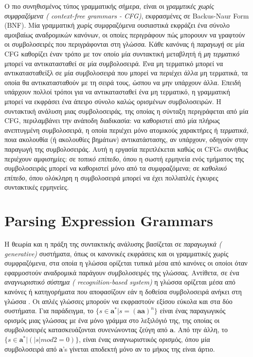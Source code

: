\documentclass[diploma]{softlab-thesis}
\begin{document}
Ο πιο συνηθισμένος τύπος γραμματικής σήμερα, είναι οι \textit{γραμμτικές χωρίς συμφραζόμενα ( context-free grammars - CFG)}, εκφρασμένες σε  Backus-Naur Form (BNF). 
Μία γραμματική χωρίς συμφραζόμενα ουσιαστικά εκφράζει ένα σύνολο αμοιβαίως αναδρομικών κανόνων, οι οποίες περιγράφουν πώς μπορουυν να γραφτούν οι συμβολοσειρές που περιγράφονται στη γλώσσα.
Κάθε κανόνας ή \textit{ παραγωγή}  σε μία  CFG καθορίζει έναν τρόπο με τον οποίο μία συντακτική μεταβλητή ή  \textit{ μη τερματικό} μπορεί να αντικατασταθεί σε μία συμβολοσειρά. 
Ένα μη τερματικό μπορεί να αντικατασταθείξλ σε μία συμβολοσειρά που μπορεί να περιέχει άλλα μη τερματικά, τα οποία θα αντικατασταθούν με τη σειρά τους, ώσπου να μην υπάρχουν άλλα.
Επειδή υπάρχουν πολλοί τρόποι για να αντικατασταθεί ένα μη τερματικό, η γραμματική μπορεί να εκφράσει ένα άπειρο σύνολο καλώς ορισμένων συμβολοσειρών.
Η συντακτική ανάλυση μιας συμβολοσειράς, της οποίας η σύνταξη περιγράφεται από μία  CFG, περιλαμβάνει την ανάποδη διαδικασία: 
να καθοριστεί από μία πλήρως ανεπτυγμένη συμβολοσειρά, η οποία περιέχει μόνο ατομικούς χαρακτήρες ή  \textit{ τερματικά}, ποια ακολουθία (ή ακολουθίες βημάτων) αντικατάστασης, αν υπάρχουν, οδηγούν στην παραγωγή της συμβολοσειράς.
Αυτή η εργασία περιπλέκεται καθώς οι  CFGs  συνήθως περιέχουν αμφισημίες:
σε  \textit{τοπικό επίπεδο}, όπου η σωστή ερμηνεία ενός τμήματος της συμβολοσειράς μπορεί να καθοριστεί μόνο από τα συμφραζόμενα; 
σε \textit{καθολικό επίπεδο}, όπου ολόκληρη η συμβολοσειρά μπορεί να έχει πολλαπλές έγκυρες συντακτικές ερμηνείες.

\section{ Parsing Expression Grammars}
 Η θεωρία και η πράξη της συντακτικής ανάλυσης βασίζεται σε \textit{ παραγωγικά ( generative)} συστήματα, όπως οι κανονικές εκφράσεις και οι γραμματικές χωρίς συμφραζόμενα, στα οποία η γλώσσα ορίζεται τυπικά μέσα από κανόνες οι οποίοι όταν εφαρμοστούν αναδρομικά παράγουν συμβολοσειρές της γλώσσας.
Αντίθετα, σε ένα \textit{ αναγνωριστικό σύστημα ( recognition-based system)} η γλώσσα ορίζεται μέσα από κανόνες ή κατηγορήματα που αποφασίζουν εάν η δοθείσα συμβολοσειρά ανήκει στη γλώσσα \cite{Ford2004}.
Οι απλές γλώσσες μπορούν να εκφραστούν εξίσου εύκολα και στα δύο συστήματα.
 Για παράδειγμα, το $\{ s \in \mathbf{a}^* | s = {(\mathbf{a}\mathbf{a})}^n\}$ είναι ένας παραγωγικός ορισμός μιας γλώσσας με ένα μόνο γράμμα στο λεξιλόγιό της, της οποίας οι συμβολοσειρές 
 κατασκευάζονται συνενώνοντας ζεύγη από $ \mathbf{a}$.
 Από την άλλη, το $\{ s \in \mathbf{a}^* | (\lvert s \rvert mod2=0)\}$, είναι ένας αναγνωριστικός ορισμός, όπου μία συμβολοσειρά από  $\mathbf{a}$'s γίνεται αποδεκτή μόνο αν το μήκος της είναι άρτιο.
 
\end{document}
